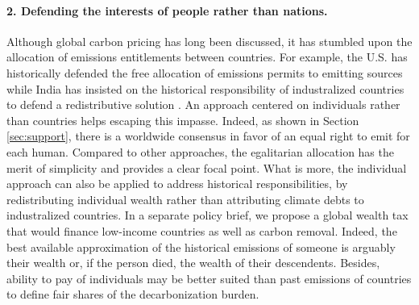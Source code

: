 \documentclass[12pt,english]{article}
\begin{document}
\paragraph*{2. Defending the interests of people rather than nations.}
Although global carbon pricing has long been discussed, it has stumbled upon the allocation of emissions entitlements between countries. 
For example, the U.S. has historically defended the free allocation of emissions permits to emitting sources while India has insisted on the historical responsibility of industralized countries to defend a redistributive solution \citep{bertram_tradeable_1992,michaelowa_report_2012}. 
An approach centered on individuals rather than countries helps escaping this impasse. Indeed, as shown in Section \ref{sec:support}, there is a worldwide consensus in favor of an equal right to emit for each human. 
Compared to other approaches, the egalitarian allocation has the merit of simplicity and provides a clear focal point. 
What is more, the individual approach can also be applied to address historical responsibilities, by redistributing individual wealth rather than attributing climate debts to industralized countries. In a separate policy brief, we propose a global wealth tax that would finance low-income countries as well as carbon removal. 
Indeed, the best available approximation of the historical emissions of someone is arguably their wealth or, if the person died, the wealth of their descendents. Besides, ability to pay of individuals may be better suited than past emissions of countries to define fair shares of the decarbonization burden. %
\end{document}
